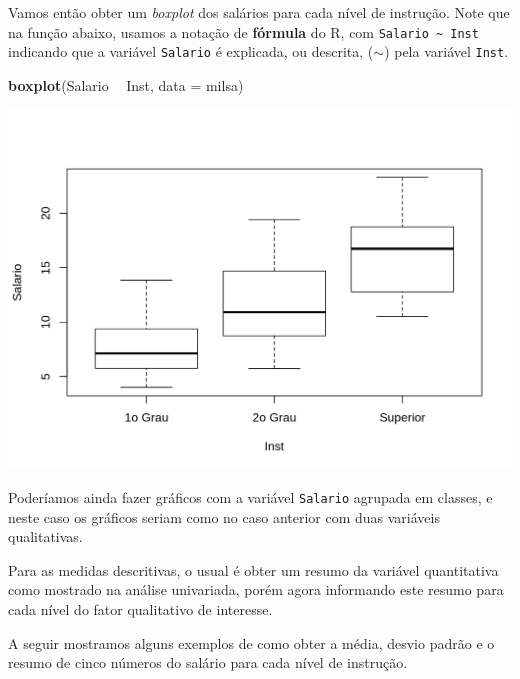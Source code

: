 \documentclass[10pt,a4paper]{book}
\newenvironment{Shaded}{\begin{snugshade}}{\end{snugshade}}
\newcommand{\KeywordTok}[1]{\textcolor[rgb]{0.13,0.29,0.53}{\textbf{#1}}}
\newcommand{\DataTypeTok}[1]{\textcolor[rgb]{0.13,0.29,0.53}{#1}}
\newcommand{\StringTok}[1]{\textcolor[rgb]{0.31,0.60,0.02}{#1}}
\newcommand{\OperatorTok}[1]{\textcolor[rgb]{0.81,0.36,0.00}{\textbf{#1}}}
\newcommand{\NormalTok}[1]{#1}
\begin{document}
Vamos então obter um \emph{boxplot} dos salários para cada nível de
instrução. Note que na função abaixo, usamos a notação de
\textbf{fórmula} do R, com \texttt{Salario\ \textasciitilde{}\ Inst}
indicando que a variável \texttt{Salario} é explicada, ou descrita,
(\(\sim\)) pela variável \texttt{Inst}.

\begin{Shaded}
\begin{Highlighting}[]
\KeywordTok{boxplot}\NormalTok{(Salario }\OperatorTok{~}\StringTok{ }\NormalTok{Inst, }\DataTypeTok{data =}\NormalTok{ milsa)}
\end{Highlighting}
\end{Shaded}

\begin{center}\includegraphics{figures/unnamed-chunk-318-1} \end{center}

Poderíamos ainda fazer gráficos com a variável \texttt{Salario} agrupada
em classes, e neste caso os gráficos seriam como no caso anterior com
duas variáveis qualitativas.

Para as medidas descritivas, o usual é obter um resumo da variável
quantitativa como mostrado na análise univariada, porém agora informando
este resumo para cada nível do fator qualitativo de interesse.

A seguir mostramos alguns exemplos de como obter a média, desvio padrão
e o resumo de cinco números do salário para cada nível de instrução.
\end{document}
